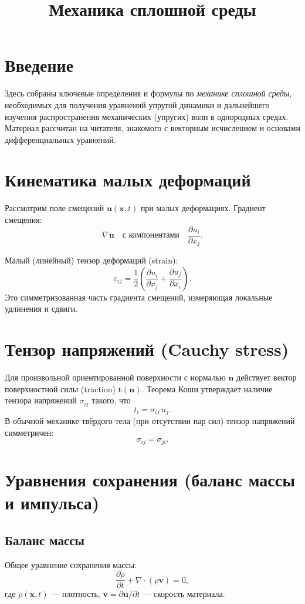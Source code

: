 \documentclass[12pt,a4paper]{article}
\title{Механика сплошной среды}
\author{ }
\date{}
\begin{document}
\maketitle

\section*{Введение}
Здесь собраны ключевые определения и формулы по \emph{механике сплошной среды}, необходимых для получения уравнений упругой динамики и дальнейшего изучения распространения механических (упругих) волн в однородных средах. Материал рассчитан на читателя, знакомого с векторным исчислением и основами дифференциальных уравнений.

\section{Кинематика малых деформаций}
Рассмотрим поле смещений $\mathbf{u}(\mathbf{x},t)$ при малых деформациях.  
Градиент смещения:
\[
\nabla\mathbf{u} \quad\text{с компонентами}\quad \frac{\partial u_i}{\partial x_j}.
\]

Малый (линейный) тензор деформаций (strain):
\[
\varepsilon_{ij} = \frac{1}{2}\left(\frac{\partial u_i}{\partial x_j} + \frac{\partial u_j}{\partial x_i}\right).
\]
Это симметризованная часть градиента смещений, измеряющая локальные удлинения и сдвиги.

\section{Тензор напряжений (Cauchy stress)}
Для произвольной ориентированной поверхности с нормалью $\mathbf{n}$ действует вектор поверхностной силы (traction) $\mathbf{t}(\mathbf{n})$. Теорема Коши утверждает наличие тензора напряжений $\sigma_{ij}$ такого, что
\[
t_i = \sigma_{ij}\, n_j.
\]
В обычной механике твёрдого тела (при отсутствии пар сил) тензор напряжений симметричен:
\[
\sigma_{ij} = \sigma_{ji}.
\]

\section{Уравнения сохранения (баланс массы и импульса)}
\subsection*{Баланс массы}
Общее уравнение сохранения массы:
\[
\frac{\partial \rho}{\partial t} + \nabla\!\cdot(\rho \mathbf{v}) = 0,
\]
где $\rho(\mathbf{x},t)$ --- плотность, $\mathbf{v}=\partial\mathbf{u}/\partial t$ --- скорость материала.
\end{document}
